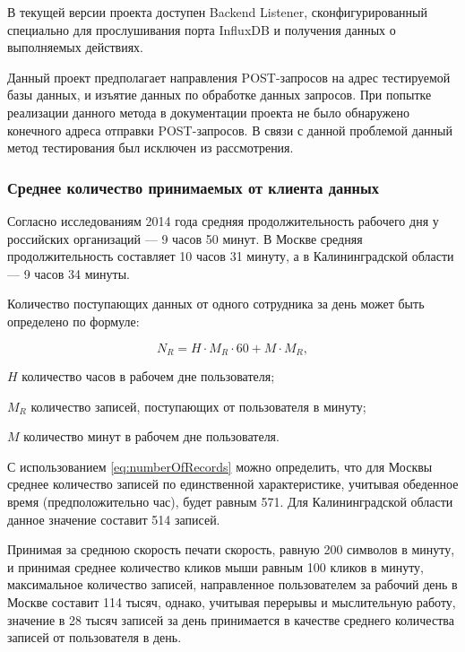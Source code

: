 В текущей версии проекта доступен Backend Listener, сконфигурированный специально для прослушивания порта InfluxDB и получения данных о выполняемых действиях.

Данный проект предполагает направления POST-запросов на адрес тестируемой базы данных, и изъятие данных по обработке данных запросов. При попытке реализации данного метода в документации проекта не было обнаружено конечного адреса отправки POST-запросов. В связи с данной проблемой данный метод тестирования был исключен из рассмотрения.

\subsubsection{Среднее количество принимаемых от клиента данных}

Согласно исследованиям 2014 года средняя продолжительность рабочего дня у российских организаций --- 9 часов 50 минут. В Москве средняя продолжительность составляет 10 часов 31 минуту, а в Калининградской области --- 9 часов 34 минуты. \cite{yandRes}

Количество поступающих данных от одного сотрудника за день может быть определено по формуле:

\begin{equation}
\label{eq:numberOfRecords}
N_R = H \cdot M_R \cdot 60 + M \cdot M_R,
\end{equation}
\begin{eqexpl}[15mm]
\item{$H$} количество часов в рабочем дне пользователя;
\item{$M_R$} количество записей, поступающих от пользователя в минуту;
\item{$M$} количество минут в рабочем дне пользователя.
\end{eqexpl}

С использованием \eqref{eq:numberOfRecords} можно определить, что для Москвы среднее количество записей по единственной характеристике, учитывая обеденное время (предположительно час), будет равным 571. Для Калининградской области данное значение составит 514 записей.

Принимая за среднюю скорость печати скорость, равную 200 символов в минуту, и принимая среднее количество кликов мыши равным 100 кликов в минуту, максимальное количество записей, направленное пользователем за рабочий день в Москве составит 114 тысяч, однако, учитывая перерывы и мыслительную работу, значение в 28 тысяч записей за день принимается в качестве среднего количества записей от пользователя в день.

